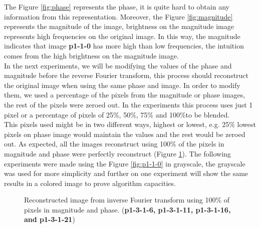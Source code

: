 \documentclass[12pt,a4paper]{article}
\begin{document}
The Figure \ref{fig:phase} represents the phase, it is quite hard to obtain any information from this representation. Moreover, the Figure \ref{fig:magnitude} represents the magnitude of the image, brightness on the magnitude image represents high frequencies on the original image. In this way, the magnitude indicates that image \textbf{p1-1-0} has more high than low frequencies, the intuition comes from the high brightness on the magnitude image. \\

In the next experiments, we will be modifying the values of the phase and magnitude before the reverse Fourier transform, this process should reconstruct the original image when using the same phase and image. In order to modify them, we used a percentage of the pixels from the magnitude or phase images, the rest of the pixels were zeroed out. In the experiments this process uses just 1 pixel or a percentage of pixels of 25\%, 50\%, 75\% and 100\%to be blended. \\

This pixels used might be in two different ways, highest or lowest, e.g. 25\% lowest pixels on phase image would maintain the values and the rest would be zeroed out. As expected, all the images reconstruct using 100\% of the pixels in magnitude and phase were perfectly reconstruct (Figure \ref{fig:inverse}). The following experiments were made using the Figure \ref{fig:p1-1-0} in grayscale, the grayscale was used for more simplicity and further on one experiment will show the same results in a colored image to prove algorithm capacities. \\


\begin{figure}[!h]
	\centering
	{%
		\setlength{\fboxsep}{1pt}%
		\setlength{\fboxrule}{1pt}%
	}%
	\caption{Reconstructed image from inverse Fourier transform using 100\% of pixels in magnitude and phase. (\textbf{p1-3-1-6, p1-3-1-11, p1-3-1-16, and p1-3-1-21})}
	\label{fig:inverse}
\end{figure}
\end{document}
